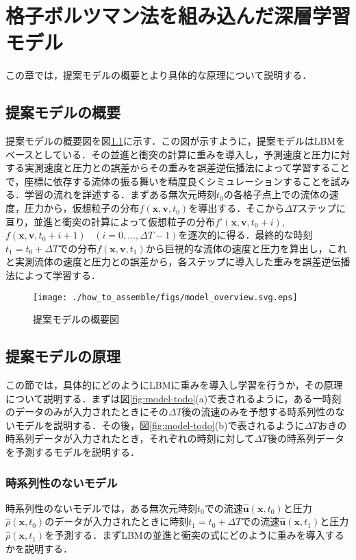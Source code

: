 \chapter{格子ボルツマン法を組み込んだ深層学習モデル\label{chap:how-to-assemble}}
この章では，提案モデルの概要とより具体的な原理について説明する．

\section{提案モデルの概要}
提案モデルの概要図を図\ref{fig:overview}に示す．この図が示すように，提案モデルはLBMをベースとしている．その並進と衝突の計算に重みを導入し，予測速度と圧力に対する実測速度と圧力との誤差からその重みを誤差逆伝播法によって学習することで，座標に依存する流体の振る舞いを精度良くシミュレーションすることを試みる．学習の流れを詳述する．まずある無次元時刻$t_0$の各格子点上での流体の速度，圧力から，仮想粒子の分布$f(\bm{x}, \bm{v}, t_0)$を導出する．そこから$\Delta T$ステップに亘り，並進と衝突の計算によって仮想粒子の分布$f'(\bm{x}, \bm{v}, t_0+i)$, $f(\bm{x}, \bm{v}, t_0+i+1) \hspace{10pt}(i=0,...,\Delta T - 1)$を逐次的に得る．最終的な時刻$t_1 = t_0 + \Delta T$での分布$f(\bm{x}, \bm{v}, t_1)$から巨視的な流体の速度と圧力を算出し，これと実測流体の速度と圧力との誤差から，各ステップに導入した重みを誤差逆伝播法によって学習する．
\begin{figure}[htbp]
  \centering
  \texttt{[image: ./how\_to\_assemble/figs/model\_overview.svg.eps]}
  \caption{提案モデルの概要図}
  \label{fig:overview}
\end{figure}

\section{提案モデルの原理}
この節では，具体的にどのようにLBMに重みを導入し学習を行うか，その原理について説明する．まずは図\ref{fig:model-todo}(a)で表されるように，ある一時刻のデータのみが入力されたときにその$\Delta T$後の流速のみを予想する時系列性のないモデルを説明する．その後，図\ref{fig:model-todo}(b)で表されるように$\Delta T$おきの時系列データが入力されたとき，それぞれの時刻に対して$\Delta T$後の時系列データを予測するモデルを説明する．

\subsection{時系列性のないモデル\label{subsection:time-series-less-model}}
時系列性のないモデルでは，ある無次元時刻$t_0$での流速$\hat{\bm{u}}(\bm{x}, t_0)$と圧力$\hat{\rho}(\bm{x}, t_0)$のデータが入力されたときに時刻$t_1 = t_0 + \Delta T$での流速$\hat{\bm{u}}(\bm{x}, t_1)$と圧力$\hat{\rho}(\bm{x}, t_1)$を予測する．まずLBMの並進と衝突の式にどのように重みを導入するかを説明する．

